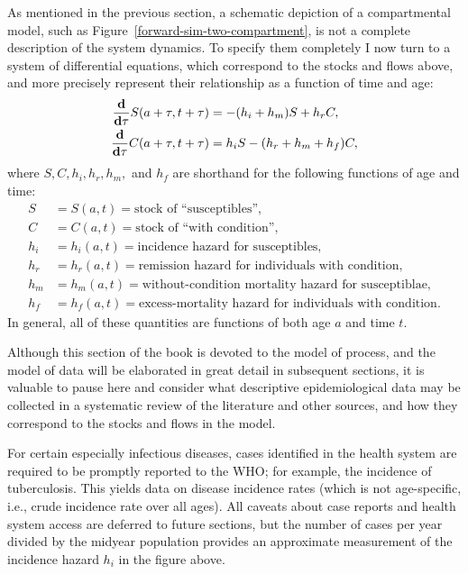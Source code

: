 As mentioned in the previous section, a schematic depiction of a
compartmental model, such as Figure~\ref{forward-sim-two-compartment},
is not a complete description of the system dynamics.  To specify them
completely I now turn to a system of differential equations,
which correspond to the stocks and flows above, and more precisely
represent their relationship as a function of time and age:
\begin{align*}
\frac{\mathbf{d} }{\mathbf{d} \tau} S(a+\tau,t+\tau) &= -(h_i + h_m)S + h_rC,\\
\frac{\mathbf{d}}{\mathbf{d} \tau} C(a+\tau,t+\tau) &= h_iS - (h_r + h_m + h_f)C,\\
\end{align*}
where $S,C,h_i,h_r,h_m,$ and $h_f$ are shorthand for the following functions of age and time:
\begin{align*}
S &= S(a,t) = \text{stock of ``susceptibles''},\\
C &= C(a,t) = \text{stock of ``with condition''},\\[.1in]
h_i &= h_i(a,t) = \text{incidence hazard for susceptibles},\\
h_r &= h_r(a,t) = \text{remission hazard for individuals with condition},\\
h_m &= h_m(a,t) = \text{without-condition mortality hazard for susceptiblae},\\
h_f &= h_f(a,t) = \text{excess-mortality hazard for individuals with
condition}.
\end{align*}
In general, all of these quantities are functions of both age $a$ and
time $t$.

Although this section of the book is devoted to the model of process,
and the model of data will be elaborated in great detail in subsequent
sections, it is valuable to pause here and consider what descriptive
epidemiological data may be collected in a systematic review of the
literature and other sources, and how they correspond to the stocks and
flows in the model.

For certain especially infectious diseases, cases identified in the
health system are required to be promptly reported to the WHO; for
example, the incidence of tuberculosis.  This yields data on disease
incidence rates (which is not age-specific, i.e., crude incidence rate
over all ages).  All caveats about case reports and health system
access are deferred to future sections, but the number of cases per
year divided by the midyear population provides an approximate
measurement of the incidence hazard $h_i$ in the figure above.


